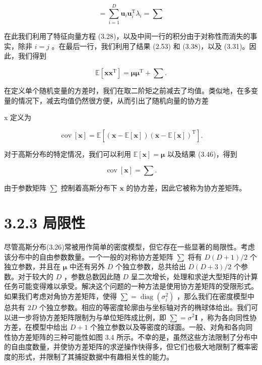 \documentclass[10pt]{report}
\begin{document}
\[
= \mathop{\sum }\limits_{{i = 1}}^{D}{\mathbf{u}}_{i}{\mathbf{u}}_{i}^{\mathrm{T}}{\lambda }_{i} = \mathbf{\sum } \tag{3.45}
\]

在此我们利用了特征向量方程 (3.28)，以及中间一行的积分由于对称性而消失的事实，除非 \(i = j\) 。在最后一行，我们利用了结果 (2.53) 和 (3.38)，以及 (3.31)。因此，我们得到

\[
\mathbb{E}\left\lbrack  {\mathbf{x}{\mathbf{x}}^{\mathrm{T}}}\right\rbrack   = \mathbf{\mu }{\mathbf{\mu }}^{\mathrm{T}} + \mathbf{\sum }. \tag{3.46}
\]

在定义单个随机变量的方差时，我们在取二阶矩之前减去了均值。类似地，在多变量的情况下，减去均值仍然很方便，从而引出了随机向量的协方差

\(\mathrm{x}\) 定义为

\[
\operatorname{cov}\left\lbrack  \mathbf{x}\right\rbrack   = \mathbb{E}\left\lbrack  {\left( {\mathbf{x} - \mathbb{E}\left\lbrack  \mathbf{x}\right\rbrack  }\right) {\left( \mathbf{x} - \mathbb{E}\left\lbrack  \mathbf{x}\right\rbrack  \right) }^{\mathrm{T}}}\right\rbrack  . \tag{3.47}
\]

对于高斯分布的特定情况，我们可以利用 \(\mathbb{E}\left\lbrack  \mathbf{x}\right\rbrack   = \mathbf{\mu }\) 以及结果 (3.46)，得到

\[
\operatorname{cov}\left\lbrack  \mathbf{x}\right\rbrack   = \mathbf{\sum }. \tag{3.48}
\]

由于参数矩阵 \(\mathbf{\sum }\) 控制着高斯分布下 \(\mathbf{x}\) 的协方差，因此它被称为协方差矩阵。

\section*{3.2.3 局限性}

尽管高斯分布(3.26)常被用作简单的密度模型，但它存在一些显著的局限性。考虑该分布中的自由参数数量。一个一般的对称协方差矩阵 \(\mathbf{\sum }\) 将有 \(D\left( {D + 1}\right) /2\) 个独立参数，并且在 \(\mathbf{\mu }\) 中还有另外 \(D\) 个独立参数，总共给出 \(D\left( {D + 3}\right) /2\) 个参数。对于较大的 \(D\) ，参数总数因此随 \(D\) 呈二次增长，处理和求逆大型矩阵的计算任务可能变得难以承受。解决这个问题的一种方法是使用协方差矩阵的受限形式。如果我们考虑对角协方差矩阵，使得 \(\mathbf{\sum } = \operatorname{diag}\left( {\sigma }_{i}^{2}\right)\) ，那么我们在密度模型中总共有 \({2D}\) 个独立参数。相应的等密度轮廓由与坐标轴对齐的椭球体给出。我们可以进一步将协方差矩阵限制为与单位矩阵成比例，即 \(\mathbf{\sum } = {\sigma }^{2}\mathbf{I}\) ，称为各向同性协方差，在模型中给出 \(D + 1\) 个独立参数以及等密度的球面。一般、对角和各向同性协方差矩阵的三种可能性如图 3.4 所示。不幸的是，虽然这些方法限制了分布中的自由度数量，并使协方差矩阵的求逆操作快得多，但它们也极大地限制了概率密度的形式，并限制了其捕捉数据中有趣相关性的能力。
\end{document}
